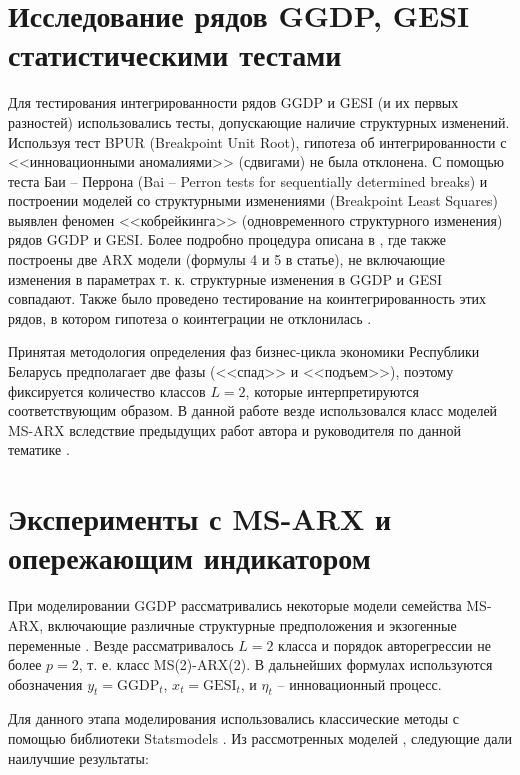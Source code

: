 \documentclass[a4paper,14pt]{extreport}
\begin{document}
\section{Исследование рядов GGDP, GESI статистическими тестами}

\label{section:gdp_stattests}

Для тестирования интегрированности рядов GGDP и GESI (и их первых разностей) использовались тесты, допускающие наличие структурных изменений. Используя тест BPUR (Breakpoint Unit Root), гипотеза об интегрированности с <<инновационными аномалиями>> (сдвигами) не была отклонена. С помощью теста Баи – Перрона (Bai – Perron tests for sequentially determined breaks) и построении моделей со структурными изменениями (Breakpoint Least Squares) выявлен феномен <<кобрейкинга>> (одновременного структурного изменения) рядов GGDP и GESI. Более подробно процедура описана в \cite{mak_mal_bv_2020}, где также построены две ARX модели (формулы 4 и 5 в статье), не включающие изменения в параметрах т. к.  структурные изменения в GGDP и GESI совпадают. Также было проведено тестирование на коинтегрированность этих рядов, в котором гипотеза о коинтеграции не отклонилась \cite{mak_mal_bv_2020}. 

Принятая методология определения фаз бизнес-цикла экономики Республики Беларусь предполагает две фазы (<<спад>> и <<подъем>>), поэтому фиксируется количество классов $L=2$, которые интерпретируются соответствующим образом. В данной работе везде использовался класс моделей MS-ARX вследствие предыдущих работ автора и руководителя по данной тематике \cite{mak_mal_bv_2018,malVARforCycles}.


\section{Эксперименты с MS-ARX и опережающим индикатором}

При моделировании GGDP рассматривались некоторые модели семейства MS-ARX, включающие различные структурные предположения и экзогенные переменные \cite{mak_mal_bv_2020}. Везде рассматривалось $L=2$ класса и порядок авторегрессии не более $p=2$, т. е. класс MS(2)-ARX(2). В дальнейших формулах используются обозначения $y_t = \text{GGDP}_t$, $x_t = \text{GESI}_t$, и $\eta_t$ -- инновационный процесс.

Для данного этапа моделирования использовались классические методы с помощью библиотеки Statsmodels \cite{statsmodels}. Из рассмотренных моделей \cite{mak_mal_bv_2020}, следующие дали наилучшие результаты:
\end{document}
